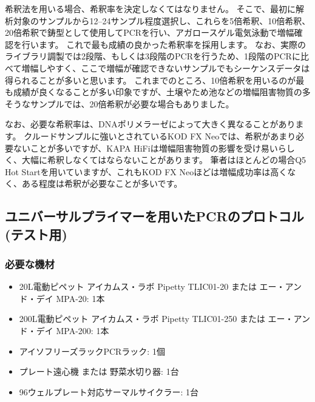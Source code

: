 \documentclass[titlepage,10pt,a4paper]{jsbook}
\begin{document}
希釈法を用いる場合、希釈率を決定しなくてはなりません。
そこで、最初に解析対象のサンプルから12--24サンプル程度選択し、これらを5倍希釈、10倍希釈、20倍希釈で鋳型として使用してPCRを行い、アガロースゲル電気泳動で増幅確認を行います。
これで最も成績の良かった希釈率を採用します。
なお、実際のライブラリ調製では2段階、もしくは3段階のPCRを行うため、1段階のPCRに比べて増幅しやすく、ここで増幅が確認できないサンプルでもシーケンスデータは得られることが多いと思います。
これまでのところ、10倍希釈を用いるのが最も成績が良くなることが多い印象ですが、土壌やため池などの増幅阻害物質の多そうなサンプルでは、20倍希釈が必要な場合もありました。

なお、必要な希釈率は、DNAポリメラーゼによって大きく異なることがあります。
クルードサンプルに強いとされているKOD FX Neoでは、希釈があまり必要ないことが多いですが、KAPA HiFiは増幅阻害物質の影響を受け易いらしく、大幅に希釈しなくてはならないことがあります。
筆者はほとんどの場合Q5 Hot Startを用いていますが、これもKOD FX Neoほどは増幅成功率は高くなく、ある程度は希釈が必要なことが多いです。

\subsection{ユニバーサルプライマーを用いたPCRのプロトコル (テスト用)}

\subsubsection{必要な機材}
\begin{itemize}
\item 20{\textmu}L電動ピペット アイカムス・ラボ Pipetty TLIC01-20 または エー・アンド・デイ MPA-20: 1本
\item 200{\textmu}L電動ピペット アイカムス・ラボ Pipetty TLIC01-250 または エー・アンド・デイ MPA-200: 1本
\item アイソフリーズラックPCRラック: 1個
\item プレート遠心機 または 野菜水切り器: 1台
\item 96ウェルプレート対応サーマルサイクラー: 1台
\end{itemize}
\end{document}

